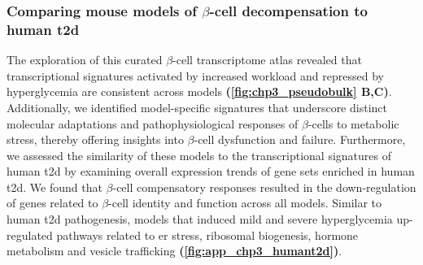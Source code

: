 \subsubsection{Comparing mouse models of $\beta$-cell decompensation to human \gls{t2d}}

\par The exploration of this curated $\beta$-cell transcriptome atlas revealed that transcriptional signatures activated by increased workload and repressed by hyperglycemia are consistent across models \textbf{(\autoref{fig:chp3_pseudobulk} B,C)}. Additionally, we identified model-specific signatures that underscore distinct molecular adaptations and pathophysiological responses of $\beta$-cells to metabolic stress, thereby offering insights into $\beta$-cell dysfunction and failure. Furthermore, we assessed the similarity of these models to the transcriptional signatures of human \gls{t2d} by examining overall expression trends of gene sets enriched in human \gls{t2d}. We found that $\beta$-cell compensatory responses resulted in the down-regulation of genes related to $\beta$-cell identity and function across all models. Similar to human \gls{t2d} pathogenesis, models that induced mild and severe hyperglycemia up-regulated pathways related to \gls{er} stress, ribosomal biogenesis, hormone metabolism and vesicle trafficking \textbf{(\autoref{fig:app_chp3_humant2d})}.

